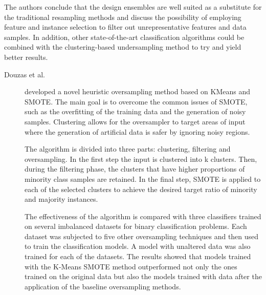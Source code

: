\begin{description}
    The authors conclude that the design ensembles are well suited as a substitute for the traditional resampling methods and discuss the possibility of employing feature and instance selection to filter out unrepresentative features and data samples. In addition, other state-of-the-art classification algorithms could be combined with the clustering-based undersampling method to try and yield better results.
\end{description}


\begin{description}
    \item[Douzas et al.]\cite{Douzas.Bacao.ea_Improvingimbalancedlearning_2018} developed a novel heuristic oversampling method based on KMeans and SMOTE. The main goal is to overcome the common issues of SMOTE, such as the overfitting of the training data and the generation of noisy samples. Clustering allows for the oversampler to target areas of input where the generation of artificial data is safer by ignoring noisy regions. 
    
    The algorithm is divided into three parts: clustering, filtering and oversampling. In the first step the input is clustered into k clusters. Then, during the filtering phase, the clusters that have higher proportions of minority class samples are retained. In the final step, SMOTE is applied to each of the selected clusters to achieve the desired target ratio of minority and majority instances. 

    The effectiveness of the algorithm is compared with three classifiers trained on several imbalanced datasets for binary classification problems. Each dataset was subjected to five other oversampling techniques and then used to train the classification models. A model with unaltered data was also trained for each of the datasets. The results showed that models trained with the K-Means SMOTE method outperformed not only the ones trained on the original data but also the models trained with data after the application of the baseline oversampling methods.
\end{description}

